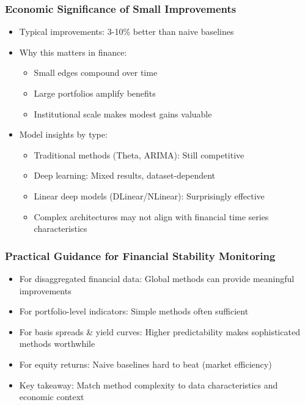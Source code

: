 \documentclass[ignorenonframetext, 9pt]{beamer}
\begin{document}
\begin{frame}
  \frametitle{Economic Significance of Small Improvements}
  \begin{itemize}
  \item Typical improvements: \alert{3-10\% better than naive baselines}
  \vspace{0.3cm}
  \item Why this matters in finance:
  \begin{itemize}
    \item Small edges compound over time
    \item Large portfolios amplify benefits
    \item Institutional scale makes modest gains valuable
  \end{itemize}
  \vspace{0.3cm}
  \item \alert{Model insights by type:}
  \begin{itemize}
    \item Traditional methods (Theta, ARIMA): Still competitive
    \item Deep learning: Mixed results, dataset-dependent
    \item Linear deep models (DLinear/NLinear): Surprisingly effective
    \item Complex architectures may not align with financial time series characteristics
  \end{itemize}
  \end{itemize}
\end{frame}






\begin{frame}
  \frametitle{Practical Guidance for Financial Stability Monitoring}
  \begin{itemize}
  \item \alert{For disaggregated financial data:} Global methods can provide meaningful improvements
  \vspace{0.3cm}
  \item \alert{For portfolio-level indicators:} Simple methods often sufficient
  \vspace{0.3cm}
  \item \alert{For basis spreads \& yield curves:} Higher predictability makes sophisticated methods worthwhile
  \vspace{0.3cm}
  \item \alert{For equity returns:} Naive baselines hard to beat (market efficiency)
  \vspace{0.3cm}
  \item \alert{Key takeaway:} Match method complexity to data characteristics and economic context
  \end{itemize}
\end{frame}
\end{document}
